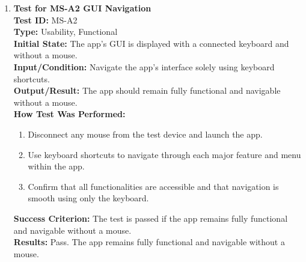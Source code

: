 \documentclass[12pt, titlepage]{article}
\begin{document}
\begin{enumerate}
    \item \textbf{Test for MS-A2 GUI Navigation} \\
      \newline
      \textbf{Test ID:} MS-A2 \\
      \textbf{Type:} Usability, Functional \\
      \textbf{Initial State:} The app’s GUI is displayed with a connected keyboard and without a mouse. \\
      \textbf{Input/Condition:} Navigate the app’s interface solely using keyboard shortcuts. \\
      \textbf{Output/Result:} The app should remain fully functional and navigable without a mouse. \\
      \textbf{How Test Was Performed:}
      \begin{enumerate}
          \item Disconnect any mouse from the test device and launch the app.
          \item Use keyboard shortcuts to navigate through each major feature and menu within the app.
          \item Confirm that all functionalities are accessible and that navigation is smooth using only the keyboard.
      \end{enumerate}
      \textbf{Success Criterion:} The test is passed if the app remains fully functional and navigable without a mouse.\\
      \textbf{Results:} Pass. The app remains fully functional and navigable without a mouse.\\
\end{enumerate}
\end{document}
